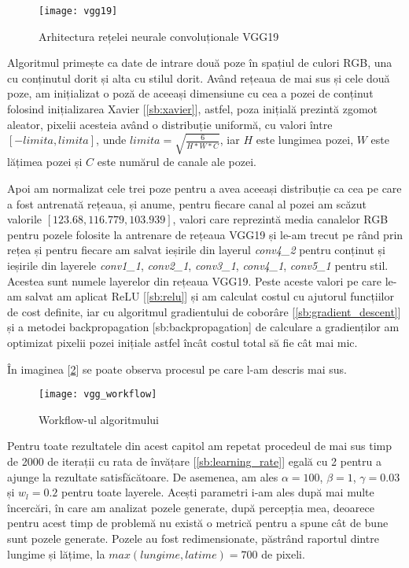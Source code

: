 \begin{figure}[H]
		\centering
        \texttt{[image: vgg19]}
        \caption{Arhitectura rețelei neurale convoluționale VGG19 \cite{arh_vgg19}}
        \label{fig:vgg19}
\end{figure}

Algoritmul primește ca date de intrare două poze în spațiul de culori RGB, una cu conținutul dorit și alta cu stilul dorit. Având rețeaua de mai sus și cele două poze, am inițializat o poză de aceeași dimensiune cu cea a pozei de conținut folosind inițializarea Xavier [\ref{sb:xavier}], astfel, poza inițială prezintă zgomot aleator, pixelii acesteia având o distribuție uniformă, cu valori între $[-limita, limita]$, unde $limita = \sqrt{\frac{6}{H * W * C}}$, iar $H$ este lungimea pozei, $W$ este lățimea pozei și $C$ este numărul de canale ale pozei.

Apoi am normalizat cele trei poze pentru a avea aceeași distribuție ca cea pe care a fost antrenată rețeaua, și anume, pentru fiecare canal al pozei am scăzut valorile $[123.68, 116.779, 103.939]$, valori care reprezintă media canalelor RGB pentru pozele folosite la antrenare de rețeaua VGG19 și le-am trecut pe rând prin rețea și pentru fiecare am salvat ieșirile din layerul \textit{conv4{\_}2} pentru conținut și ieșirile din layerele \textit{conv1{\_}1}, \textit{conv2{\_}1}, \textit{conv3{\_}1}, \textit{conv4{\_}1}, \textit{conv5{\_}1} pentru stil. Acestea sunt numele layerelor din rețeaua VGG19. Peste aceste valori pe care le-am salvat am aplicat ReLU [\ref{sb:relu}] și am calculat costul cu ajutorul funcțiilor de cost definite, iar cu algoritmul gradientului de coborâre [\ref{sb:gradient_descent}] și a metodei backpropagation [sb:backpropagation] de calculare a gradienților am optimizat pixelii pozei inițiale astfel încât costul total să fie cât mai mic.

În imaginea [\ref{fig:vgg_workflow}] se poate observa procesul pe care l-am descris mai sus.

\begin{figure}[H]
		\centering
        \texttt{[image: vgg\_workflow]}
        \caption{Workflow-ul algoritmului}
        \label{fig:vgg_workflow}
\end{figure}

Pentru toate rezultatele din acest capitol am repetat procedeul de mai sus timp de 2000 de iterații cu rata de învățare [\ref{sb:learning_rate}] egală cu 2 pentru a ajunge la rezultate satisfăcătoare. De asemenea, am ales $\alpha = 100$, $\beta = 1$, $\gamma = 0.03$ și $w_l = 0.2$ pentru toate layerele. Acești parametri i-am ales după mai multe încercări, în care am analizat pozele generate, după percepția mea, deoarece pentru acest timp de problemă nu există o metrică pentru a spune cât de bune sunt pozele generate. Pozele au fost redimensionate, păstrând raportul dintre lungime și lățime, la $max(lungime, latime) = 700$ de pixeli.

